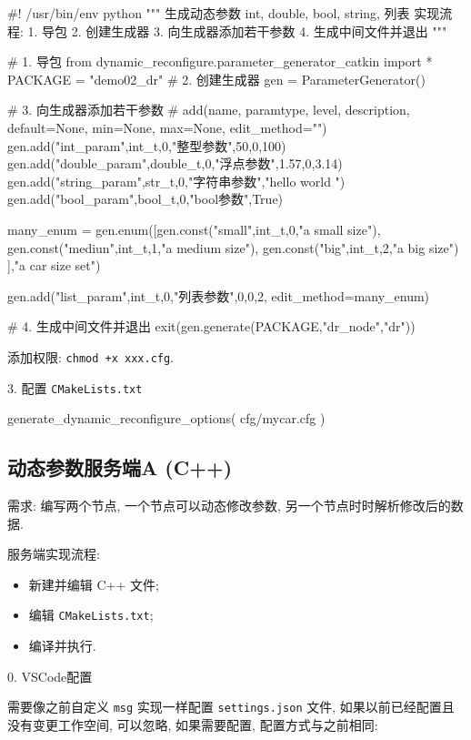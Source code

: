 \documentclass[openany, fontset=windowsold]{ctexbook}
\theoremstyle{kaiti}
\theoremstyle{normal}
\begin{document}
\begin{python}
  #! /usr/bin/env python
  """
  生成动态参数 int, double, bool, string, 列表
  实现流程:
      1. 导包
      2. 创建生成器
      3. 向生成器添加若干参数
      4. 生成中间文件并退出
  """

  # 1. 导包
  from dynamic_reconfigure.parameter_generator_catkin import *
  PACKAGE = "demo02_dr"
  # 2. 创建生成器
  gen = ParameterGenerator()

  # 3. 向生成器添加若干参数
  # add(name, paramtype, level, description, default=None, min=None, max=None, edit_method="")
  gen.add("int_param",int_t,0,"整型参数",50,0,100)
  gen.add("double_param",double_t,0,"浮点参数",1.57,0,3.14)
  gen.add("string_param",str_t,0,"字符串参数","hello world ")
  gen.add("bool_param",bool_t,0,"bool参数",True)

  many_enum = gen.enum([gen.const("small",int_t,0,"a small size"),
                  gen.const("mediun",int_t,1,"a medium size"),
                  gen.const("big",int_t,2,"a big size")
                  ],"a car size set")

  gen.add("list_param",int_t,0,"列表参数",0,0,2, edit_method=many_enum)

  # 4. 生成中间文件并退出
  exit(gen.generate(PACKAGE,"dr_node","dr"))
\end{python}

添加权限: \verb|chmod +x xxx.cfg|.

3. 配置 \verb|CMakeLists.txt|

\begin{bash}
  generate_dynamic_reconfigure_options(
    cfg/mycar.cfg
  )
\end{bash}

\subsection{动态参数服务端A (C++)}

需求: 编写两个节点, 一个节点可以动态修改参数, 另一个节点时时解析修改后的数据.

服务端实现流程:

\begin{itemize}
  \item 新建并编辑 C++ 文件;
  \item 编辑 \verb|CMakeLists.txt|;
  \item 编译并执行.
\end{itemize}

0. VSCode配置

需要像之前自定义 \verb|msg| 实现一样配置 \verb|settings.json| 文件, 如果以前已经配置且没有变更工作空间, 可以忽略, 如果需要配置, 配置方式与之前相同:
\end{document}
